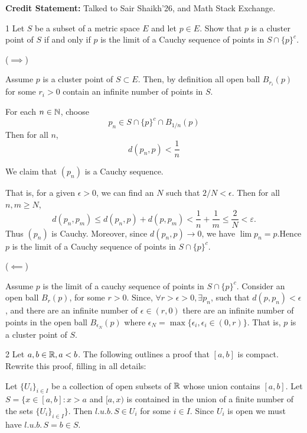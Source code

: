 \documentclass[12pt]{article}
\begin{document}

\textbf{Credit Statement:} Talked to Sair Shaikh'26, and Math Stack Exchange. 


\begin{problem}{1}
    Let $S$ be a subset of a metric space $E$ and let $p \in E$. Show that $p$ is a cluster point of $S$ if and only if $p$ is the limit of a Cauchy sequence of points in $S \cap \{p\}^c$.
\end{problem}

\begin{solution}
    \bbni

    ($\implies$)

    Assume $p$ is a cluster point of $S \subset E$. Then, by definition all open ball $B_{r_i}{(p)}$ for some $r_i>0$ contain an infinite number of points in $S$.
    
    For each $n\in\mathbb N$, choose \[ p_n \in S\cap\{p\}^c \cap B_{1/n}(p)\]
    Then for all $n$, 
    \[d(p_n,p)<\frac{1}{n}\]

    We claim that $(p_n)$ is a Cauchy sequence. 
    
    
    That is, for a given $\epsilon > 0$, we can find an $N$ such that $2/N<\epsilon$.  
    Then for all $n,m\ge N$,
    \[d(p_n,p_m)\le d(p_n,p)+d(p,p_m)<\frac{1}{n}+\frac{1}{m} \le \frac{2}{N} <\varepsilon.\]
    Thus $(p_n)$ is Cauchy. Moreover, since $d(p_n,p)\to 0$, we have $\lim p_n=p$.Hence $p$ is the limit of a Cauchy sequence of points in $S\cap\{p\}^c$.

    ($\impliedby$)

    Assume $p$ is the limit of a cauchy sequence of points in $S \cap \{p\}^c$. Consider an open ball $B_r{(p)}$, for some $r>0$. Since, $\forall r > \epsilon >0, \exists p_n$, such that $d(p,p_n) < \epsilon$, and there are an infinite number of $\epsilon \in (r, 0)$ there are an infinite number of points in the open ball $B_{\epsilon_N}{(p)}$ where $\epsilon_N = \max\{\epsilon_i, \epsilon_i \in (0, r)\}$. That is, $p$ is a cluster point of $S$. 
\end{solution}

\newpage 

\begin{problem}{2}
    Let $a, b \in \mathbb R, a < b$. The following outlines a proof that $[a,b]$ is compact. Rewrite this proof, filling in all details: 
    
    Let $\{U_i\}_{i \in I}$ be a collection of open subsets of $\mathbb R$ whose union contains $[a, b]$. Let $S = \{x \in [a, b]: x> a$  and $[a, x)$ is contained in the union of a finite number of the sets $\{U_i\}_{i\in I}\}$. Then $l.u.b. \, S \in U_i$ for some $i \in I$. Since $U_i$ is open we must have $l.u.b. \, S = b \in S$. 
\end{problem}
\end{document}
